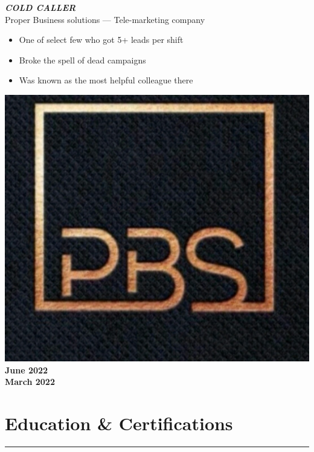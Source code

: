 \documentclass[10pt]{article}
\newcommand{\fancy}[1]{\Large\textbf{\textit{#1}}}
\begin{document}
\noindent
\vspace{2em}
\begin{minipage}{0.7\textwidth}
 \fancy{COLD CALLER} \\
{\large Proper Business solutions --- Tele-marketing company} \\
\begin{itemize}
    \item One of select few who got 5+ leads per shift
    \item Broke the spell of dead campaigns
    \item Was known as the most helpful colleague there
\end{itemize}   
\end{minipage}
\hspace{-2pt}
\begin{minipage}{0.2\textwidth}
\begin{center}
\includegraphics[width=\textwidth]{pbs_lowquality_coldcalling.jpg} \\
    \large\textbf{June 2022\\March 2022}
\end{center}
\end{minipage}


\vspace{1em}
\section*{Education \& Certifications}
\hrule
\end{document}
